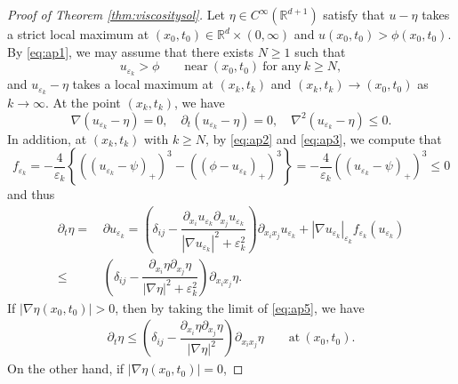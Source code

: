 \documentclass{amsart}
\theoremstyle{definition}
\def\R{{\mathbb{R}}}
\begin{document}
\begin{proof}[Proof of Theorem \ref{thm:viscositysol}]
Let $\eta \in C^\infty (\R^{d+1})$ satisfy that $u-\eta$ takes a strict local maximum at $(x_0, t_0) \in \R^d \times (0,\infty)$
and $u(x_0,t_0)>\phi (x_0,t_0)$. By \eqref{eq:ap1}, we may assume that there exists $N\geq 1$ such that
\begin{equation}\label{eq:ap2}
    u_{\varepsilon _k} >\phi
    \qquad \text{near} \ (x_0,t_0) \ \text{for any} \ k\geq N,
\end{equation}
and $u_{\varepsilon_k} -\eta$ takes a local maximum at $(x_k,t_k)$ and $(x_k, t_k) \to (x_0,t_0)$ as $k\to \infty$. At the point $(x_k, t_k)$, we have
\begin{equation}\label{eq:ap3}
    \nabla (u_{\varepsilon_k} -\eta)=0, \quad
    \partial_t (u_{\varepsilon_k} -\eta)=0,
    \quad 
    \nabla ^2 (u_{\varepsilon_k} -\eta) \leq 0.
\end{equation}
In addition, at $(x_k,t_k)$ with $k\geq N$, by \eqref{eq:ap2} and \eqref{eq:ap3}, 
we compute that
\begin{equation*}
    f_{\varepsilon_k} 
= -\frac{4}{\varepsilon_k} 
\left\{
((u_{\varepsilon_k} -\psi )_+)^3
-
((\phi -u_{\varepsilon_k} )_+)^3
\right\}
=
-\frac{4}{\varepsilon_k} 
((u_{\varepsilon_k} -\psi )_+)^3
\leq 0
\end{equation*}
and thus
\begin{equation}\label{eq:ap5}
\begin{split}
    \partial _t \eta 
    =& \, \partial u_{\varepsilon_k}
    =
    \left( \delta_{ij} - \dfrac{\partial_{x_i} u_{\varepsilon_k} \partial_{x_j} u_{\varepsilon_k}}{|\nabla u_{\varepsilon_k} |^2 +\varepsilon_k ^2} \right) \partial_{x_i x_j} u_{\varepsilon_k}
+ |\nabla u_{\varepsilon_k}|_{\varepsilon_k} f_{\varepsilon_k} (u_{\varepsilon_k})\\
\leq &\, 
\left( \delta_{ij} - \dfrac{\partial_{x_i} \eta \partial_{x_j} \eta}{|\nabla \eta |^2 +\varepsilon_k ^2} \right) \partial_{x_i x_j} \eta.
\end{split}
\end{equation}
If $|\nabla \eta (x_0,t_0)|>0$, then by taking the limit of \eqref{eq:ap5}, we have
\begin{equation}\label{eq:ap6}
\begin{split}
    \partial _t \eta 
\leq  
\left( \delta_{ij} - \dfrac{\partial_{x_i} \eta \partial_{x_j} \eta}{|\nabla \eta |^2 } \right) \partial_{x_i x_j} \eta
\qquad \text{at} \ (x_0,t_0).
\end{split}
\end{equation}
On the other hand, if $|\nabla \eta (x_0,t_0)|=0$, 

\end{proof}
\end{document}
